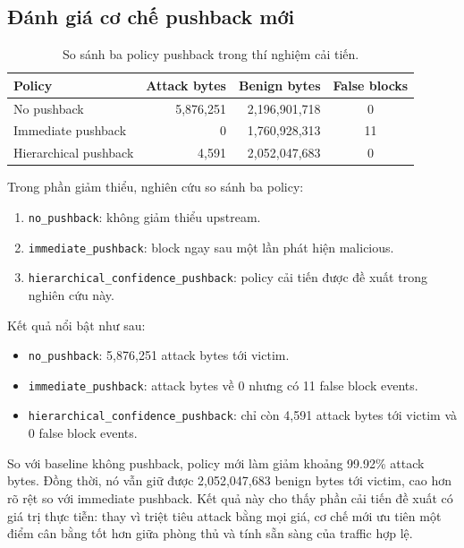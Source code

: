 \subsection{Đánh giá cơ chế pushback mới}

\begin{table}
\caption{So sánh ba policy pushback trong thí nghiệm cải tiến.}
\label{tab:pushback-compare}
\centering
\begin{tabular}{lrrc}
\toprule
\textbf{Policy} & \textbf{Attack bytes} & \textbf{Benign bytes} & \textbf{False blocks} \\
\midrule
No pushback & 5{,}876{,}251 & 2{,}196{,}901{,}718 & 0 \\
Immediate pushback & 0 & 1{,}760{,}928{,}313 & 11 \\
Hierarchical pushback & 4{,}591 & 2{,}052{,}047{,}683 & 0 \\
\bottomrule
\end{tabular}
\end{table}

Trong phần giảm thiểu, nghiên cứu so sánh ba policy:
\begin{enumerate}
\item \texttt{no\_pushback}: không giảm thiểu upstream.
\item \texttt{immediate\_pushback}: block ngay sau một lần phát hiện malicious.
\item \texttt{hierarchical\_confidence\_pushback}: policy cải tiến được đề xuất trong nghiên cứu này.
\end{enumerate}

Kết quả nổi bật như sau:
\begin{itemize}
\item \texttt{no\_pushback}: 5{,}876{,}251 attack bytes tới victim.
\item \texttt{immediate\_pushback}: attack bytes về 0 nhưng có 11 false block events.
\item \texttt{hierarchical\_confidence\_pushback}: chỉ còn 4{,}591 attack bytes tới victim và 0 false block events.
\end{itemize}

So với baseline không pushback, policy mới làm giảm khoảng 99.92\% attack bytes. Đồng thời, nó vẫn giữ được 2{,}052{,}047{,}683 benign bytes tới victim, cao hơn rõ rệt so với immediate pushback. Kết quả này cho thấy phần cải tiến đề xuất có giá trị thực tiễn: thay vì triệt tiêu attack bằng mọi giá, cơ chế mới ưu tiên một điểm cân bằng tốt hơn giữa phòng thủ và tính sẵn sàng của traffic hợp lệ.

